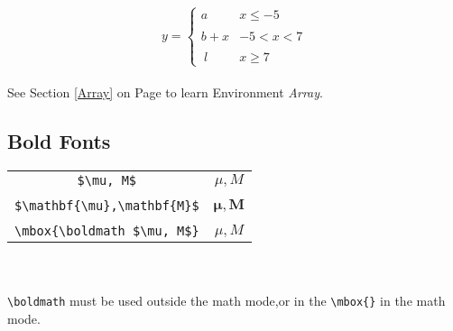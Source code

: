 \documentclass[a4paper]{report}
\begin{document}
\[y = \left\{ \begin{array}{ll}
a & x \leq -5\\\\
b+x & -5 < x < 7\\\\\
l & x \geq 7
\end{array} \right.\]\\

See Section \ref{Array} on Page \pageref{Array} to learn Environment
\emph{Array}.


\subsection{Bold Fonts}
\begin{tabular}{c @{\quad} c}

\verb|$\mu, M$| & $\mu, M$\\\\

\verb|$\mathbf{\mu},\mathbf{M}$| & $\mathbf{\mu},\mathbf{M}$\\\\

\verb|\mbox{\boldmath $\mu, M$}| & \mbox{\boldmath $\mu, M$}

\end{tabular}\\\\

\verb|\boldmath| must be used outside the math mode,or in the
\verb|\mbox{}| in the math mode.
\end{document}
